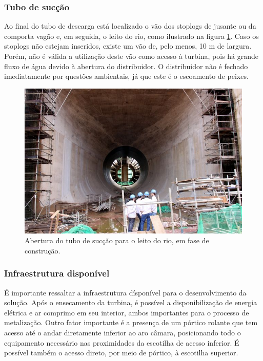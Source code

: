 \subsubsection{Tubo de sucção}

Ao final do tubo de descarga está localizado o vão dos stoplogs 
de jusante ou da comporta vagão e, em seguida, o leito do rio, como ilustrado
na figura \ref{fig::tubo_suc}.
Caso os stoplogs não estejam inseridos, existe um vão de, pelo menos, 10 m de largura. Porém, não
é válida a utilização deste vão como acesso à turbina, pois há grande fluxo de
água devido à abertura do distribuidor. O distribuidor não é fechado
imediatamente por questões ambientais, já que este é o escoamento de peixes.


\begin{figure}[h!]	
	\includegraphics[width=\columnwidth]{sota/figs/viagem/img_5086}
	\caption{Abertura do tubo de sucção para o leito do rio, em fase de
	construção.}
	\label{fig::tubo_suc}
\end{figure}

\subsubsection{Infraestrutura disponível}
É importante ressaltar a infraestrutura dísponível para o desenvolvimento da solução. 
Após o ensecamento da turbina, é possível a disponibilização de energia elétrica
e ar comprimo em seu interior, ambos importantes para o processo de metalização. Outro fator 
importante é a presença de um pórtico rolante que tem acesso até o andar diretamente 
inferior ao aro câmara, posicionando todo o equipamento necessário nas proximidades 
da escotilha de acesso inferior. É possível também o acesso direto, por meio de pórtico, 
à escotilha superior.


